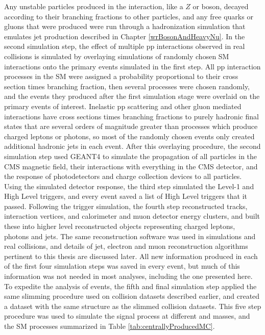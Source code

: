 Any unstable particles produced in the interaction, like a $Z$ or \WR boson, decayed according to 
their branching fractions to other particles, and any free quarks or gluons that were produced were 
run through a hadronization simulation that emulates jet production described in Chapter \ref{wrBosonAndHeavyNu}.  In the second 
simulation step, the effect of multiple pp interactions observed in real collisions is simulated by 
overlaying simulations of randomly chosen SM interactions onto the primary events simulated in the first 
step.  All pp interaction processes in the SM were assigned a probability proportional to their cross section 
times branching fraction, then several processes were chosen randomly, and the events they produced after 
the first simulation stage were overlaid on the primary events of interest.  Inelastic pp scattering and 
other gluon mediated interactions have cross sections times branching fractions to purely hadronic 
final states that are several orders of magnitude greater than processes which produce charged leptons 
or photons, so most of the randomly chosen events only created additional hadronic jets in each event.  After 
this overlaying procedure, the second simulation step used GEANT4 \cite{geant4} to simulate the propagation of all particles in 
the CMS magnetic field, their interactions with everything in the CMS detector, and the response of 
photodetectors and charge collection devices to all particles.  Using the simulated detector response, 
the third step simulated the Level-1 and High Level triggers, and every event saved a list of High 
Level triggers that it passed.  Following the trigger simulation, the fourth step reconstructed tracks, 
interaction vertices, and calorimeter and muon detector energy clusters, and built these into higher level 
reconstructed objects representing charged leptons, photons and jets.  The same reconstruction software 
was used in simulations and real collisions, and details of jet, electron and muon reconstruction 
algorithms pertinent to this thesis are discussed later.  All new information produced in each of the first 
four simulation steps was saved in every event, but much of this information was not needed in most 
analyses, including the one presented here.  To expedite the analysis of \MC events, the fifth and final 
simulation step applied the same slimming procedure used on collision datasets described earlier, and 
created a \MC dataset with the same structure as the slimmed collision datasets.  This five step procedure 
was used to simulate the \WR signal process at different \mWR and \mnul masses, and the SM processes 
summarized in Table \ref{tab:centrallyProducedMC}.

